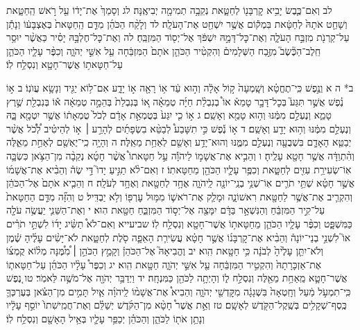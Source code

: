 \documentclass[twoside, openany, parskip=half, 11pt]{book}
\begin{document}
לב וְאִם־כֶּ֛בֶשׂ יָבִ֥יא קׇרְבָּנ֖וֹ לְחַטָּ֑את נְקֵבָ֥ה תְמִימָ֖ה יְבִיאֶֽנָּה׃ לג וְסָמַךְ֙ אֶת־יָד֔וֹ עַ֖ל רֹ֣אשׁ הַֽחַטָּ֑את וְשָׁחַ֤ט אֹתָהּ֙ לְחַטָּ֔את בִּמְק֕וֹם אֲשֶׁ֥ר יִשְׁחַ֖ט אֶת־הָעֹלָֽה׃ לד וְלָקַ֨ח הַכֹּהֵ֜ן מִדַּ֤ם הַֽחַטָּאת֙ בְּאֶצְבָּע֔וֹ וְנָתַ֕ן עַל־קַרְנֹ֖ת מִזְבַּ֣ח הָעֹלָ֑ה וְאֶת־כׇּל־דָּמָ֣הּ יִשְׁפֹּ֔ךְ אֶל־יְס֖וֹד הַמִּזְבֵּֽחַ׃ לה וְאֶת־כׇּל־חֶלְבָּ֣הּ יָסִ֗יר כַּאֲשֶׁ֨ר יוּסַ֥ר חֵֽלֶב־הַכֶּ֘שֶׂב֮ מִזֶּ֣בַח הַשְּׁלָמִים֒ וְהִקְטִ֨יר הַכֹּהֵ֤ן אֹתָם֙ הַמִּזְבֵּ֔חָה עַ֖ל אִשֵּׁ֣י יְהֹוָ֑ה וְכִפֶּ֨ר עָלָ֧יו הַכֹּהֵ֛ן עַל־חַטָּאת֥וֹ אֲשֶׁר־חָטָ֖א וְנִסְלַ֥ח לֽוֹ׃

ב* ה א וְנֶ֣פֶשׁ כִּֽי־תֶחֱטָ֗א וְשָֽׁמְעָה֙ ק֣וֹל אָלָ֔ה וְה֣וּא עֵ֔ד א֥וֹ רָאָ֖ה א֣וֹ יָדָ֑ע אִם־ל֥וֹא יַגִּ֖יד וְנָשָׂ֥א עֲוֺנֽוֹ׃ ב א֣וֹ נֶ֗פֶשׁ אֲשֶׁ֣ר תִּגַּע֮ בְּכׇל־דָּבָ֣ר טָמֵא֒ אוֹ֩ בְנִבְלַ֨ת חַיָּ֜ה טְמֵאָ֗ה א֚וֹ בְּנִבְלַת֙ בְּהֵמָ֣ה טְמֵאָ֔ה א֕וֹ בְּנִבְלַ֖ת שֶׁ֣רֶץ טָמֵ֑א וְנֶעְלַ֣ם מִמֶּ֔נּוּ וְה֥וּא טָמֵ֖א וְאָשֵֽׁם׃ ג א֣וֹ כִ֤י יִגַּע֙ בְּטֻמְאַ֣ת אָדָ֔ם לְכֹל֙ טֻמְאָת֔וֹ אֲשֶׁ֥ר יִטְמָ֖א בָּ֑הּ וְנֶעְלַ֣ם מִמֶּ֔נּוּ וְה֥וּא יָדַ֖ע וְאָשֵֽׁם׃ ד א֣וֹ נֶ֡פֶשׁ כִּ֣י תִשָּׁבַע֩ לְבַטֵּ֨א בִשְׂפָתַ֜יִם לְהָרַ֣ע ׀ א֣וֹ לְהֵיטִ֗יב לְ֠כֹ֠ל אֲשֶׁ֨ר יְבַטֵּ֧א הָאָדָ֛ם בִּשְׁבֻעָ֖ה וְנֶעְלַ֣ם מִמֶּ֑נּוּ וְהוּא־יָדַ֥ע וְאָשֵׁ֖ם לְאַחַ֥ת מֵאֵֽלֶּה׃ ה וְהָיָ֥ה כִֽי־יֶאְשַׁ֖ם לְאַחַ֣ת מֵאֵ֑לֶּה וְהִ֨תְוַדָּ֔ה אֲשֶׁ֥ר חָטָ֖א עָלֶֽיהָ׃ ו וְהֵבִ֣יא אֶת־אֲשָׁמ֣וֹ לַיהֹוָ֡ה עַ֣ל חַטָּאתוֹ֩ אֲשֶׁ֨ר חָטָ֜א נְקֵבָ֨ה מִן־הַצֹּ֥אן כִּשְׂבָּ֛ה אֽוֹ־שְׂעִירַ֥ת עִזִּ֖ים לְחַטָּ֑את וְכִפֶּ֥ר עָלָ֛יו הַכֹּהֵ֖ן מֵחַטָּאתֽוֹ׃ ז וְאִם־לֹ֨א תַגִּ֣יעַ יָדוֹ֮ דֵּ֣י שֶׂה֒ וְהֵבִ֨יא אֶת־אֲשָׁמ֜וֹ אֲשֶׁ֣ר חָטָ֗א שְׁתֵּ֥י תֹרִ֛ים אֽוֹ־שְׁנֵ֥י בְנֵֽי־יוֹנָ֖ה לַֽיהֹוָ֑ה אֶחָ֥ד לְחַטָּ֖את וְאֶחָ֥ד לְעֹלָֽה׃ ח וְהֵבִ֤יא אֹתָם֙ אֶל־הַכֹּהֵ֔ן וְהִקְרִ֛יב אֶת־אֲשֶׁ֥ר לַחַטָּ֖את רִאשׁוֹנָ֑ה וּמָלַ֧ק אֶת־רֹאשׁ֛וֹ מִמּ֥וּל עׇרְפּ֖וֹ וְלֹ֥א יַבְדִּֽיל׃ ט וְהִזָּ֞ה מִדַּ֤ם הַחַטָּאת֙ עַל־קִ֣יר הַמִּזְבֵּ֔חַ וְהַנִּשְׁאָ֣ר בַּדָּ֔ם יִמָּצֵ֖ה אֶל־יְס֣וֹד הַמִּזְבֵּ֑חַ חַטָּ֖את הֽוּא׃ י וְאֶת־הַשֵּׁנִ֛י יַעֲשֶׂ֥ה עֹלָ֖ה כַּמִּשְׁפָּ֑ט וְכִפֶּ֨ר עָלָ֧יו הַכֹּהֵ֛ן מֵחַטָּאת֥וֹ אֲשֶׁר־חָטָ֖א וְנִסְלַ֥ח לֽוֹ׃
שביעייא וְאִם־לֹא֩ תַשִּׂ֨יג יָד֜וֹ לִשְׁתֵּ֣י תֹרִ֗ים אוֹ֮ לִשְׁנֵ֣י בְנֵי־יוֹנָה֒ וְהֵבִ֨יא אֶת־קׇרְבָּנ֜וֹ אֲשֶׁ֣ר חָטָ֗א עֲשִׂירִ֧ת הָאֵפָ֛ה סֹ֖לֶת לְחַטָּ֑את לֹא־יָשִׂ֨ים עָלֶ֜יהָ שֶׁ֗מֶן וְלֹא־יִתֵּ֤ן עָלֶ֙יהָ֙ לְבֹנָ֔ה כִּ֥י חַטָּ֖את הִֽוא׃ יב וֶהֱבִיאָהּ֮ אֶל־הַכֹּהֵן֒ וְקָמַ֣ץ הַכֹּהֵ֣ן ׀ מִ֠מֶּ֠נָּה מְל֨וֹא קֻמְצ֜וֹ אֶת־אַזְכָּרָתָהּ֙ וְהִקְטִ֣יר הַמִּזְבֵּ֔חָה עַ֖ל אִשֵּׁ֣י יְהֹוָ֑ה חַטָּ֖את הִֽוא׃ יג וְכִפֶּר֩ עָלָ֨יו הַכֹּהֵ֜ן עַל־חַטָּאת֧וֹ אֲשֶׁר־חָטָ֛א מֵֽאַחַ֥ת מֵאֵ֖לֶּה וְנִסְלַ֣ח ל֑וֹ וְהָיְתָ֥ה לַכֹּהֵ֖ן כַּמִּנְחָֽה׃
יד וַיְדַבֵּ֥ר יְהֹוָ֖ה אֶל־מֹשֶׁ֥ה לֵּאמֹֽר׃ טו נֶ֚פֶשׁ כִּֽי־תִמְעֹ֣ל מַ֔עַל וְחָֽטְאָה֙ בִּשְׁגָגָ֔ה מִקׇּדְשֵׁ֖י יְהֹוָ֑ה וְהֵבִיא֩ אֶת־אֲשָׁמ֨וֹ לַֽיהֹוָ֜ה אַ֧יִל תָּמִ֣ים מִן־הַצֹּ֗אן בְּעֶרְכְּךָ֛ כֶּֽסֶף־שְׁקָלִ֥ים בְּשֶֽׁקֶל־הַקֹּ֖דֶשׁ לְאָשָֽׁם׃ טז וְאֵ֣ת אֲשֶׁר֩ חָטָ֨א מִן־הַקֹּ֜דֶשׁ יְשַׁלֵּ֗ם וְאֶת־חֲמִֽישִׁתוֹ֙ יוֹסֵ֣ף עָלָ֔יו וְנָתַ֥ן אֹת֖וֹ לַכֹּהֵ֑ן וְהַכֹּהֵ֗ן יְכַפֵּ֥ר עָלָ֛יו בְּאֵ֥יל הָאָשָׁ֖ם וְנִסְלַ֥ח לֽוֹ׃
\end{document}
